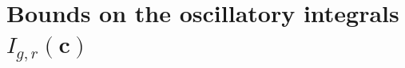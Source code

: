 \documentclass[10pt]{amsart}
\theoremstyle{plain}
\theoremstyle{plain}
\renewcommand{\vec}[1]{\mathbf{#1}}
\theoremstyle{remark}
\theoremstyle{definition}
\renewcommand{\hat}{\widehat}
\newcommand{\TT}{\mathbb{T}}
\begin{document}
%
\section{Bounds on the oscillatory integrals $I_{g,r}(\vec{c})$}\label{osil}
 
\end{document}
